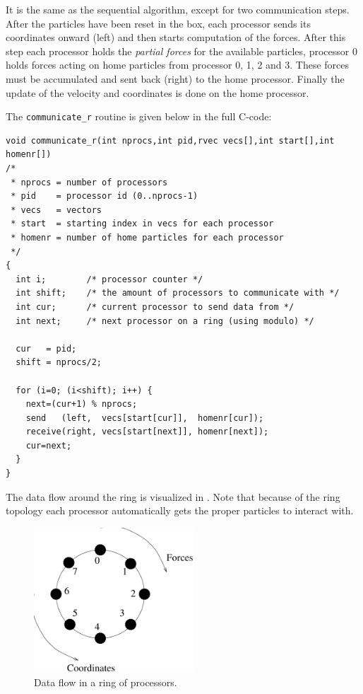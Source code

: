 It is the same as the sequential algorithm, except for two
communication steps. After the particles have been reset in the box,
each processor sends its coordinates onward (left) and then starts computation
of the forces.  After this step each processor holds the {\em partial
forces} for the available particles, {\eg} processor 0 holds forces
acting on home particles from processor 0, 1, 2 and 3. These forces
must be accumulated and sent back (right) to the home
processor. Finally the update of the velocity and coordinates is done
on the home processor.

The {\tt communicate\_r} routine is given below in the full C-code:
\begin{footnotesize}
\begin{verbatim}
void communicate_r(int nprocs,int pid,rvec vecs[],int start[],int homenr[])
/* 
 * nprocs = number of processors
 * pid    = processor id (0..nprocs-1)
 * vecs   = vectors
 * start  = starting index in vecs for each processor
 * homenr = number of home particles for each processor
 */
{
  int i;        /* processor counter */
  int shift;    /* the amount of processors to communicate with */
  int cur;      /* current processor to send data from */
  int next;     /* next processor on a ring (using modulo) */

  cur   = pid;
  shift = nprocs/2;

  for (i=0; (i<shift); i++) {
    next=(cur+1) % nprocs;      
    send   (left,  vecs[start[cur]],  homenr[cur]);
    receive(right, vecs[start[next]], homenr[next]);
    cur=next;
  }
}
\end{verbatim}

\end{footnotesize}

The data flow around the ring is visualized in . 
Note that because of the ring topology each processor automatically 
gets the proper particles to interact with.
\begin {figure}
\centerline{\includegraphics[width=6cm]{plots/ring}}
\caption {Data flow in a ring of processors.}
\label{fig:ring}
\end {figure}

